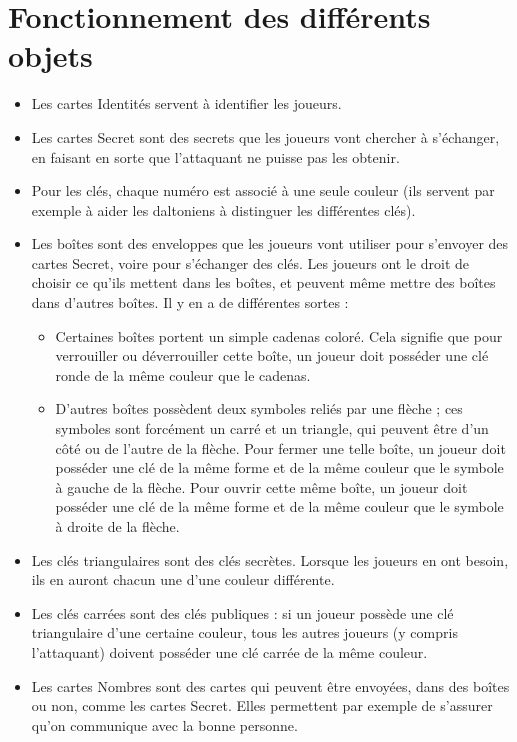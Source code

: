 \documentclass[a4paper,10pt]{article}
\begin{document}
\section{Fonctionnement des différents objets}
\begin{itemize}
	\item Les cartes Identités servent à identifier les joueurs.
	\item Les cartes Secret sont des secrets que les joueurs vont chercher à s'échanger, en faisant en sorte que l'attaquant ne puisse pas les obtenir.
	\item Pour les clés, chaque numéro est associé à une seule couleur (ils servent par exemple à aider les daltoniens à distinguer les différentes clés).
	\item Les boîtes sont des enveloppes que les joueurs vont utiliser pour s'envoyer des cartes Secret, voire pour s'échanger des clés. Les joueurs ont le droit de choisir ce qu'ils mettent dans les boîtes, et peuvent même mettre des boîtes dans d'autres boîtes. Il y en a de différentes sortes :
		\begin{itemize}
			\item Certaines boîtes portent un simple cadenas coloré. Cela signifie que pour verrouiller ou déverrouiller cette boîte, un joueur doit posséder une clé ronde de la même couleur que le cadenas.
			\item D'autres boîtes possèdent deux symboles reliés par une flèche ; ces symboles sont forcément un carré et un triangle, qui peuvent être d'un côté ou de l'autre de la flèche. Pour fermer une telle boîte, un joueur doit posséder une clé de la même forme et de la même couleur que le symbole à gauche de la flèche. Pour ouvrir cette même boîte, un joueur doit posséder une clé de la même forme et de la même couleur que le symbole à droite de la flèche. 
		\end{itemize}
	\item Les clés triangulaires sont des clés secrètes. Lorsque les joueurs en ont besoin, ils en auront chacun une d'une couleur différente.
	\item Les clés carrées sont des clés publiques : si un joueur possède une clé triangulaire d'une certaine couleur, tous les autres joueurs (y compris l'attaquant) doivent posséder une clé carrée de la même couleur.
	\item Les cartes Nombres sont des cartes qui peuvent être envoyées, dans des boîtes ou non, comme les cartes Secret. Elles permettent par exemple de s'assurer qu'on communique avec la bonne personne.
\end{itemize}
\end{document}
